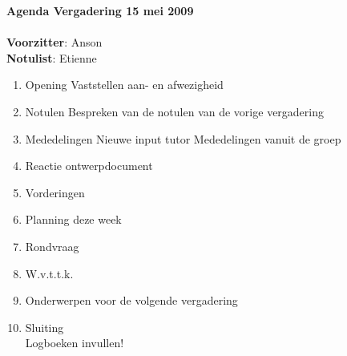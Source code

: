 \documentclass[11pt,oneside,a4paper]{article}
\begin{document}
\textbf{{\LARGE{Agenda Vergadering 15 mei 2009}}}\\ \\
\textbf{Voorzitter}: Anson\\
\textbf{Notulist}: Etienne\\

\begin{enumerate}

    \item Opening
    		\subitem Vaststellen aan- en afwezigheid
    \item Notulen
        \subitem Bespreken van de notulen van de vorige vergadering
    \item Mededelingen
			\subitem Nieuwe input tutor
			\subitem Mededelingen vanuit de groep

	 \item Reactie ontwerpdocument
	 \item Vorderingen
    \item Planning deze week

    \item Rondvraag
	 \item W.v.t.t.k.
	 \item Onderwerpen voor de volgende vergadering
    \item Sluiting\\

    Logboeken invullen!
\end{enumerate}
\end{document}
